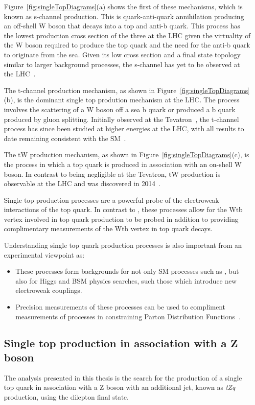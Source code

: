 Figure~\ref{fig:singleTopDiagrams}(a) shows the first of these mechanisms, which is known as s-channel production. 
This is quark-anti-quark annihilation producing an off-shell W boson that decays into a top and anti-b quark.
This process has the lowest production cross section of the three at the LHC given the virtuality of the W boson required to produce the top quark and the need for the anti-b quark to originate from the sea.
Given its low cross section and a final state topology similar to larger background processes, the s-channel has yet to be observed at the LHC~\cite{Khachatryan:2016ewo}.

The t-channel production mechanism, as shown in Figure~\ref{fig:singleTopDiagrams}(b), is the dominant single top prodution mechanism at the LHC.
The process involves the scattering of a W boson off a sea b quark or produced a b quark produced by gluon splitting.
Initially observed at the Tevatron~\cite{Aaltonen:2009jj,Abazov:2009ii}, the t-channel process has since been studied at higher energies at the LHC, with all results to date remaining consistent with the SM~\cite{Berta:2017ghf,Morton:2018wkb}.	

The tW production mechanism, as shown in Figure~\ref{fig:singleTopDiagrams}(c), is the process in which  a top quark is produced in association with an on-shell W boson.
In contrast to being negligible at the Tevatron, tW production is observable at the LHC and was discovered in 2014~\cite{Chatrchyan:2014tua}.

Single top production processes are a powerful probe of the electroweak interactions of the top quark.
In contrast to \ttbar, these processes allow for the Wtb vertex involved in top quark production to be probed in addition to providing complimentary measurements of the Wtb vertex in top quark decays.

Understanding single top quark production processes is also important from an experimental viewpoint as:
\begin{itemize}
\item These processes form backgrounds for not only SM processes such as \ttbar, but also for Higgs and BSM physics searches, such those which introduce new electroweak couplings.
\item Precision measurements of these processes can be used to compliment measurements of \ttbar processes in constraining Parton Distribution Functions~\cite{Guffanti:2010yu}.
\end{itemize}


\subsection{Single top production in association with a Z boson}\label{subsec:tZqTheory}
The analysis presented in this thesis is the search for the production of a single top quark in association with a Z boson with an additional jet, known as \emph{tZq} production, using the dilepton final state.

